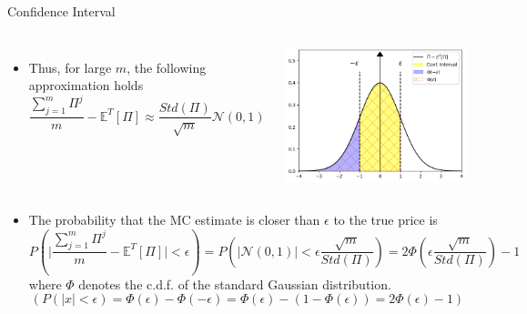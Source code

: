 \documentclass{beamer}
\begin{document}
\begin{frame}{Confidence Interval}
  	\begin{columns}
	  \begin{itemize}
  	\item<1-> Thus, for large $m$, the following approximation holds
    \begin{equation*}
      \frac{\sum_{j=1}^{m}\Pi^j}{m}-\mathbb{E}^T[\Pi]\approx \frac{Std(\Pi)}{\sqrt{m}}\mathcal{N}(0,1)
    \end{equation*}
	\end{itemize}
	\includegraphics[width=0.9\linewidth]{epsilon}
	\end{columns}
	\begin{itemize}
  	\item<2-> The probability that the MC estimate is closer than $\epsilon$ to the true price is
    \begin{equation*}
      P\left(\bigg|\frac{\sum_{j=1}^m\Pi^j}{m}-\mathbb{E}^T[\Pi]\bigg|<\epsilon\right) = P\left(|\mathcal{N}(0,1)|<\epsilon\frac{\sqrt{m}}{Std(\Pi)}\right) =
      2\Phi\left(\epsilon\frac{\sqrt{m}}{Std(\Pi)}\right)-1
    \end{equation*}
    where $\Phi$ denotes the c.d.f. of the standard Gaussian distribution.
    \begin{equation*}
    	\left(P(|x|<\epsilon) = \Phi(\epsilon) - \Phi(-\epsilon) = \Phi(\epsilon) - (1 - \Phi(\epsilon)) = 2\Phi(\epsilon) - 1 \right)
    \end{equation*}
  \end{itemize}
\end{frame}
\end{document}
